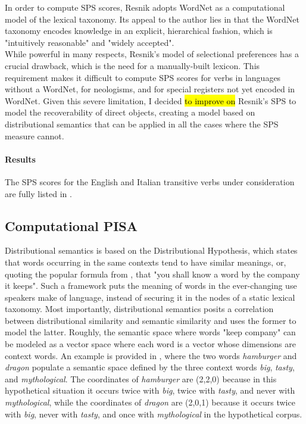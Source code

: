 In order to compute SPS scores, Resnik adopts WordNet \parencite{beckwith1991wordnet,Miller1995} as a computational model of the lexical taxonomy. Its appeal to the author \parencite[32]{Resnik1993} lies in that the WordNet taxonomy encodes knowledge in an explicit, hierarchical fashion, which is "intuitively reasonable" and "widely accepted".\\ While powerful in many respects, Resnik's model of selectional preferences has a crucial drawback, which is the need for a manually-built lexicon. This requirement makes it difficult to compute SPS scores for verbs in languages without a WordNet, for neologisms, and for special registers not yet encoded in WordNet. Given this severe limitation, I decided \hl{to improve on} Resnik's SPS to model the recoverability of direct objects, creating a model based on distributional semantics \parencite{Lenci:2018} that can be applied in all the cases where the SPS measure cannot.

\paragraph{Results}
The SPS scores for the English and Italian transitive verbs under consideration are fully listed in .\\ %

\subsection{Computational PISA}

Distributional semantics is based on the Distributional Hypothesis, which states that words occurring in the same contexts tend to have similar meanings, or, quoting the popular formula from \textcite{firth1957synopsis}, that "you shall know a word by the company it keeps". Such a framework puts the meaning of words in the ever-changing use speakers make of language, instead of securing it in the nodes of a static lexical taxonomy. Most importantly, distributional semantics posits a correlation between distributional similarity and semantic similarity and uses the former to model the latter. Roughly, the semantic space where words "keep company" can be modeled as a vector space where each word is a vector whose dimensions are context words. An example is provided in , where the two words \textit{hamburger} and \textit{dragon} populate a semantic space defined by the three context words \textit{big}, \textit{tasty}, and \textit{mythological}. The coordinates of \textit{hamburger} are (2,2,0) because in this hypothetical situation it occurs twice with \textit{big}, twice with \textit{tasty}, and never with \textit{mythological}, while the coordinates of \textit{dragon} are (2,0,1) because it occurs twice with \textit{big}, never with \textit{tasty}, and once with \textit{mythological} in the hypothetical corpus.


